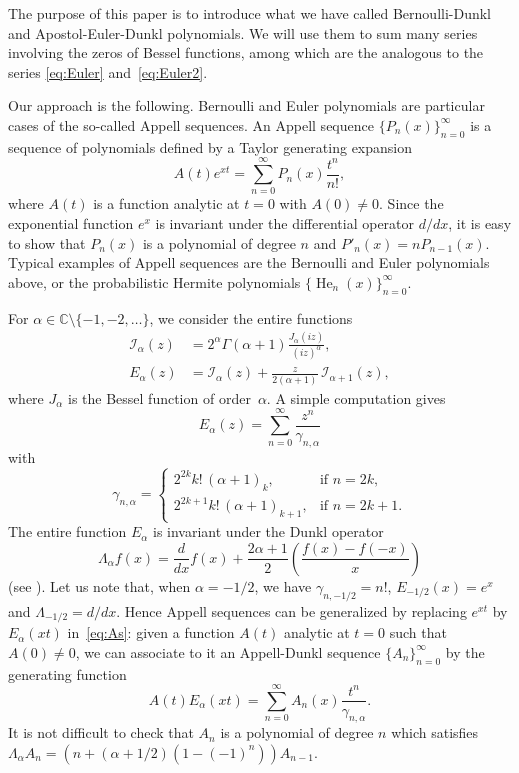 \documentclass[10pt,a4paper]{article}
\theoremstyle{plain}
\theoremstyle{definition}
\numberwithin{equation}{section} %
\newcommand{\Ea}{E_{\alpha}}
\newcommand{\La}{\Lambda_{\alpha}}
\newcommand{\I}{\mathcal{I}}
\newcommand{\CC}{\mathbb{C}}
\newcommand{\cc}{\gamma}
\begin{document}
The purpose of this paper is to introduce what we have called Bernoulli-Dunkl and Apostol-Euler-Dunkl polynomials. We will use them to sum many series involving the zeros of Bessel functions, among which are the analogous to the series \eqref{eq:Euler} and~\eqref{eq:Euler2}.

Our approach is the following. Bernoulli and Euler polynomials are particular cases of the so-called
Appell sequences. An Appell sequence $\{P_n(x)\}_{n=0}^{\infty}$ is a sequence of polynomials defined by a Taylor generating expansion
\begin{equation}
\label{eq:As}
  A(t) e^{xt} = \sum_{n=0}^{\infty} P_n(x) \frac{t^n}{n!},
\end{equation}
where $A(t)$ is a function analytic at $t=0$ with $A(0) \ne 0$.
Since the exponential function $e^x$ is invariant under the differential operator ${d}/{dx}$, it is easy to show that $P_n(x)$ is a polynomial of degree $n$ and $P'_n(x) = nP_{n-1}(x)$. Typical examples of Appell sequences are the Bernoulli and Euler polynomials above, or the probabilistic Hermite polynomials $\{\operatorname{He}_n(x)\}_{n=0}^{\infty}$.

For $\alpha\in \CC\setminus\{-1,-2,\dots \}$, we consider the entire functions
\begin{align*}
  \I_\alpha(z) &= 2^\alpha \Gamma(\alpha+1) \frac{J_\alpha(iz)}{(iz)^\alpha}, \\
  \Ea(z) &= \I_\alpha(z) + \frac{z}{2(\alpha+1)} \, \I_{\alpha+1}(z),
\end{align*}
where $J_\alpha$ is the Bessel function of order~$\alpha$. A simple computation gives
\[
  \Ea(z) = \sum_{n=0}^\infty \frac{z^n}{\cc_{n,\alpha}}
\]
with
\[
\cc_{n,\alpha} =
\begin{cases}
  2^{2k}k!\,(\alpha+1)_k, & \text{if $n=2k$},\\
  2^{2k+1}k!\,(\alpha+1)_{k+1}, & \text{if $n=2k+1$}.
\end{cases}
\]
The entire function $\Ea$ is invariant under the Dunkl operator
\[
  \La f(x) = \frac{d}{dx}f(x) + \frac{2\alpha+1}{2}
  \left(\frac{f(x)-f(-x)}{x}\right)
\]
(see \cite{Du, Ros}). Let us note that, when $\alpha = -1/2$, we have $\cc_{n,-1/2} = n!$, $E_{-1/2}(x) = e^{x}$ and $\Lambda_{-1/2} = d/dx$.
Hence Appell sequences can be generalized by replacing $e^{xt}$ by $\Ea(xt)$ in~\eqref{eq:As}: given a function $A(t)$ analytic at $t=0$ such that $A(0) \ne 0$, we can associate to it an Appell-Dunkl sequence $\{A_n\}_{n=0}^{\infty}$ by the generating function
\begin{equation}
\label{eq:APs}
  A(t)\Ea(xt) = \sum_{n=0}^\infty A_n(x) \frac{t^n}{\cc_{n,\alpha}}.
\end{equation}
It is not difficult to check that $A_n$ is a polynomial of degree $n$ which satisfies $\La A_n=(n+(\alpha+1/2)(1-(-1)^n))A_{n-1}$.
\end{document}
